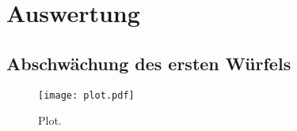 \section{Auswertung}
\label{sec:Auswertung}



\subsection{Abschwächung des ersten Würfels}


\begin{figure}
  \centering
  \texttt{[image: plot.pdf]}
  \caption{Plot.}
  \label{fig:plot}
\end{figure}
